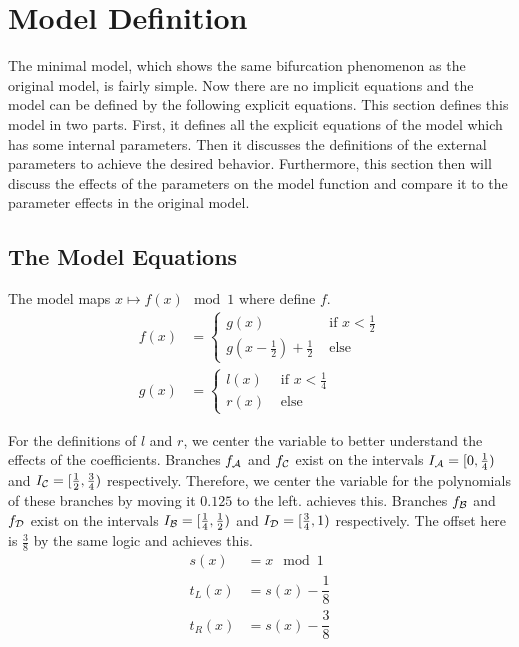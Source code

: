 \section{Model Definition}
\label{sec:minrep.definition}

The minimal model, which shows the same bifurcation phenomenon as the original model, is fairly simple.
Now there are no implicit equations and the model can be defined by the following explicit equations.
This section defines this model in two parts.
First, it defines all the explicit equations of the model which has some internal parameters.
Then it discusses the definitions of the external parameters to achieve the desired behavior.
Furthermore, this section then will discuss the effects of the parameters on the model function and compare it to the parameter effects in the original model.

\subsection{The Model Equations}

The model maps $x \mapsto f(x) \mod 1$ where  define $f$.
\begin{align}
    f(x) & = \begin{cases}
                 g(x)                                        & \text{ if } x < \frac{1}{2} \\
                 g\left(x - \frac{1}{2}\right) + \frac{1}{2} & \text{ else}
             \end{cases}
    \label{equ:final.def.f}
    \\
    g(x) & = \begin{cases}
                 l(x) & \text{ if } x < \frac{1}{4} \\
                 r(x) & \text{ else}
             \end{cases}
\end{align}

For the definitions of $l$ and $r$, we center the variable to better understand the effects of the coefficients.
Branches $f_{\mathcal{A}}$ and $f_{\mathcal{C}}$ exist on the intervals $I_{\mathcal{A}} = [0, \frac{1}{4})$ and $I_{\mathcal{C}} = [\frac{1}{2}, \frac{3}{4})$ respectively.
Therefore, we center the variable for the polynomials of these branches by moving it $0.125$ to the left.
 achieves this.
Branches $f_{\mathcal{B}}$ and $f_{\mathcal{D}}$ exist on the intervals $I_{\mathcal{B}} = [\frac{1}{4}, \frac{1}{2})$ and $I_{\mathcal{D}} = [\frac{3}{4}, 1)$ respectively.
The offset here is $\frac{3}{8}$ by the same logic and  achieves this.
\begin{align}
    s(x)   & = x \mod 1                                     \\
    t_L(x) & = s(x) - \dfrac{1}{8} \label{equ:final.def.tl} \\
    t_R(x) & = s(x) - \dfrac{3}{8} \label{equ:final.def.tr}
\end{align}

